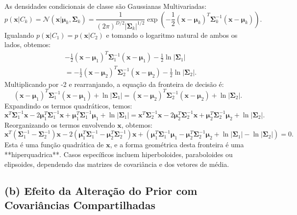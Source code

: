 \documentclass{article}
\begin{document}
As densidades condicionais de classe são Gaussianas Multivariadas:
\[
p(\mathbf{x} | C_k) = \mathcal{N}(\mathbf{x} | \boldsymbol{\mu}_k, \boldsymbol{\Sigma}_k) = \frac{1}{(2\pi)^{D/2} |\boldsymbol{\Sigma}_k|^{1/2}} \exp\left(-\frac{1}{2} (\mathbf{x} - \boldsymbol{\mu}_k)^T \boldsymbol{\Sigma}_k^{-1} (\mathbf{x} - \boldsymbol{\mu}_k)\right).
\]
Igualando $p(\mathbf{x} | C_1) = p(\mathbf{x} | C_2)$ e tomando o logaritmo natural de ambos os lados, obtemos:
\begin{align*}
& -\frac{1}{2} (\mathbf{x} - \boldsymbol{\mu}_1)^T \boldsymbol{\Sigma}_1^{-1} (\mathbf{x} - \boldsymbol{\mu}_1) - \frac{1}{2} \ln |\boldsymbol{\Sigma}_1| \\
&= -\frac{1}{2} (\mathbf{x} - \boldsymbol{\mu}_2)^T \boldsymbol{\Sigma}_2^{-1} (\mathbf{x} - \boldsymbol{\mu}_2) - \frac{1}{2} \ln |\boldsymbol{\Sigma}_2|.
\end{align*}
Multiplicando por -2 e rearranjando, a equação da fronteira de decisão é:
\[
(\mathbf{x} - \boldsymbol{\mu}_1)^T \boldsymbol{\Sigma}_1^{-1} (\mathbf{x} - \boldsymbol{\mu}_1) + \ln |\boldsymbol{\Sigma}_1| = (\mathbf{x} - \boldsymbol{\mu}_2)^T \boldsymbol{\Sigma}_2^{-1} (\mathbf{x} - \boldsymbol{\mu}_2) + \ln |\boldsymbol{\Sigma}_2|.
\]
Expandindo os termos quadráticos, temos:
\[
\mathbf{x}^T \boldsymbol{\Sigma}_1^{-1} \mathbf{x} - 2 \boldsymbol{\mu}_1^T \boldsymbol{\Sigma}_1^{-1} \mathbf{x} + \boldsymbol{\mu}_1^T \boldsymbol{\Sigma}_1^{-1} \boldsymbol{\mu}_1 + \ln |\boldsymbol{\Sigma}_1| = \mathbf{x}^T \boldsymbol{\Sigma}_2^{-1} \mathbf{x} - 2 \boldsymbol{\mu}_2^T \boldsymbol{\Sigma}_2^{-1} \mathbf{x} + \boldsymbol{\mu}_2^T \boldsymbol{\Sigma}_2^{-1} \boldsymbol{\mu}_2 + \ln |\boldsymbol{\Sigma}_2|.
\]
Reorganizando os termos envolvendo $\mathbf{x}$, obtemos:
\[
\mathbf{x}^T (\boldsymbol{\Sigma}_1^{-1} - \boldsymbol{\Sigma}_2^{-1}) \mathbf{x} - 2 (\boldsymbol{\mu}_1^T \boldsymbol{\Sigma}_1^{-1} - \boldsymbol{\mu}_2^T \boldsymbol{\Sigma}_2^{-1}) \mathbf{x} + (\boldsymbol{\mu}_1^T \boldsymbol{\Sigma}_1^{-1} \boldsymbol{\mu}_1 - \boldsymbol{\mu}_2^T \boldsymbol{\Sigma}_2^{-1} \boldsymbol{\mu}_2 + \ln |\boldsymbol{\Sigma}_1| - \ln |\boldsymbol{\Sigma}_2|) = 0.
\]
Esta é uma função quadrática de $\mathbf{x}$, e a forma geométrica desta fronteira é uma **hiperquadrica**. Casos específicos incluem hiperboloides, paraboloides ou elipsoides, dependendo das matrizes de covariância e dos vetores de média.

\subsection*{(b) Efeito da Alteração do Prior com Covariâncias Compartilhadas}
\end{document}
